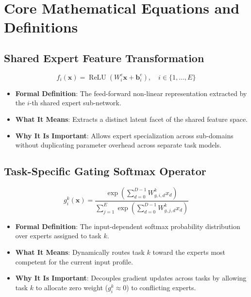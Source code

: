\documentclass[11pt,a4paper]{article}
\theoremstyle{definition}
\begin{document}
\section{Core Mathematical Equations and Definitions}

\subsection{Shared Expert Feature Transformation}
{\boldmath
\begin{equation}
f_i(\mathbf{x}) = \operatorname{ReLU}\left( W_i^e \mathbf{x} + \mathbf{b}_i^e \right), \quad i \in \{1, \dots, E\}
\end{equation}
}
\begin{itemize}
    \item \textbf{Formal Definition}: The feed-forward non-linear representation extracted by the $i$-th shared expert sub-network.
    \item \textbf{What It Means}: Extracts a distinct latent facet of the shared feature space.
    \item \textbf{Why It Is Important}: Allows expert specialization across sub-domains without duplicating parameter overhead across separate task models.
\end{itemize}

\subsection{Task-Specific Gating Softmax Operator}
{\boldmath
\begin{equation}
g_i^k(\mathbf{x}) = \frac{\exp\left( \sum_{d=0}^{D-1} W_{g, i, d}^k x_d \right)}{\sum_{j=1}^E \exp\left( \sum_{d=0}^{D-1} W_{g, j, d}^k x_d \right)}
\end{equation}
}
\begin{itemize}
    \item \textbf{Formal Definition}: The input-dependent softmax probability distribution over experts assigned to task $k$.
    \item \textbf{What It Means}: Dynamically routes task $k$ toward the experts most competent for the current input profile.
    \item \textbf{Why It Is Important}: Decouples gradient updates across tasks by allowing task $k$ to allocate zero weight ($g_i^k \approx 0$) to conflicting experts.
\end{itemize}
\end{document}
